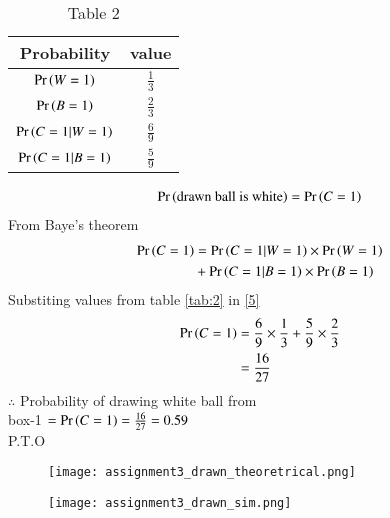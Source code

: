 \documentclass[journal,12pt,twocolumn]{IEEEtran}
\begin{document}
\begin{table}[h!]
\resizebox{7cm}{!}
{ 
\begin{tabular}{|c|c|}
\hline
Probability &  value\\
\hline
$\Pr\left(W=1\right)$ & $\frac{1}{3}$ \\
\hline
$\Pr\left(B=1\right)$ &   $\frac{2}{3}$ \\
\hline
$\Pr\left(C=1|W=1\right)$ & $\frac{6}{9}$ \\
\hline
 $\Pr\left(C=1|B=1\right)$ &   $\frac{5}{9}$ \\
\hline
\end{tabular}
}
\caption{Table 2} 
\label{tab:2}
\end{table}

\begin{align}
\Pr\left(\text{drawn ball is white}\right)&= \Pr\left(C=1\right)\\
\end{align}
 From Baye's theorem
\begin{align}
\Pr\left(C=1\right)&=\Pr\left(C=1|W=1\right) \times \Pr\left(W=1\right) \notag \\
 & +\Pr\left(C=1|B=1\right) \times \Pr\left(B=1\right)  \label{5}
\end{align}
Substiting values from table \eqref{tab:2} in \eqref{5}
\begin{align}
\Pr\left(C=1\right) &= \frac{6}{9} \times \frac{1}{3}  + \frac{5}{9} \times \frac{2}{3} \\
&=\frac{16}{27} \label{6}
\end{align}
$\therefore$ Probability of drawing white ball from\\
 box-1 $=\Pr\left(C=1\right)=\frac{16}{27}=0.59$ \\
 P.T.O \\
\begin{figure}[htb!]
\begin{center}
\texttt{[image: assignment3\_drawn\_theoretrical.png]}
\end{center}
\end{figure}

\begin{figure}[htb!]
\begin{center}
\texttt{[image: assignment3\_drawn\_sim.png]}
\end{center}
\end{figure}
\end{document}
